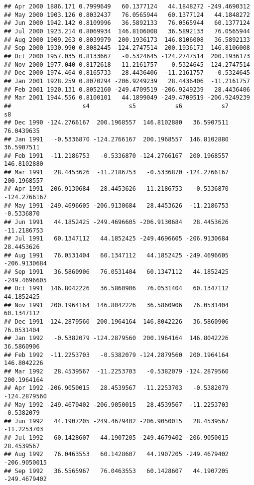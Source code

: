 \documentclass[]{article}
\begin{document}
\begin{verbatim}
## Apr 2000 1886.171 0.7999649   60.1377124   44.1848272 -249.4690312
## May 2000 1903.126 0.8032437   76.0565944   60.1377124   44.1848272
## Jun 2000 1942.142 0.8109996   36.5892133   76.0565944   60.1377124
## Jul 2000 1923.214 0.8069934  146.8106008   36.5892133   76.0565944
## Aug 2000 1909.263 0.8039979  200.1936173  146.8106008   36.5892133
## Sep 2000 1930.990 0.8082445 -124.2747514  200.1936173  146.8106008
## Oct 2000 1957.035 0.8133667   -0.5324645 -124.2747514  200.1936173
## Nov 2000 1977.040 0.8172618  -11.2161757   -0.5324645 -124.2747514
## Dec 2000 1974.464 0.8165733   28.4436406  -11.2161757   -0.5324645
## Jan 2001 1928.259 0.8070294 -206.9249239   28.4436406  -11.2161757
## Feb 2001 1920.131 0.8052160 -249.4709519 -206.9249239   28.4436406
## Mar 2001 1944.556 0.8100101   44.1899049 -249.4709519 -206.9249239
##                    s4           s5           s6           s7           s8
## Dec 1990 -124.2766167  200.1968557  146.8102880   36.5907511   76.0439635
## Jan 1991   -0.5336870 -124.2766167  200.1968557  146.8102880   36.5907511
## Feb 1991  -11.2186753   -0.5336870 -124.2766167  200.1968557  146.8102880
## Mar 1991   28.4453626  -11.2186753   -0.5336870 -124.2766167  200.1968557
## Apr 1991 -206.9130684   28.4453626  -11.2186753   -0.5336870 -124.2766167
## May 1991 -249.4696605 -206.9130684   28.4453626  -11.2186753   -0.5336870
## Jun 1991   44.1852425 -249.4696605 -206.9130684   28.4453626  -11.2186753
## Jul 1991   60.1347112   44.1852425 -249.4696605 -206.9130684   28.4453626
## Aug 1991   76.0531404   60.1347112   44.1852425 -249.4696605 -206.9130684
## Sep 1991   36.5860906   76.0531404   60.1347112   44.1852425 -249.4696605
## Oct 1991  146.8042226   36.5860906   76.0531404   60.1347112   44.1852425
## Nov 1991  200.1964164  146.8042226   36.5860906   76.0531404   60.1347112
## Dec 1991 -124.2879560  200.1964164  146.8042226   36.5860906   76.0531404
## Jan 1992   -0.5382079 -124.2879560  200.1964164  146.8042226   36.5860906
## Feb 1992  -11.2253703   -0.5382079 -124.2879560  200.1964164  146.8042226
## Mar 1992   28.4539567  -11.2253703   -0.5382079 -124.2879560  200.1964164
## Apr 1992 -206.9050015   28.4539567  -11.2253703   -0.5382079 -124.2879560
## May 1992 -249.4679402 -206.9050015   28.4539567  -11.2253703   -0.5382079
## Jun 1992   44.1907205 -249.4679402 -206.9050015   28.4539567  -11.2253703
## Jul 1992   60.1428607   44.1907205 -249.4679402 -206.9050015   28.4539567
## Aug 1992   76.0463553   60.1428607   44.1907205 -249.4679402 -206.9050015
## Sep 1992   36.5565967   76.0463553   60.1428607   44.1907205 -249.4679402

\end{verbatim}
\end{document}
